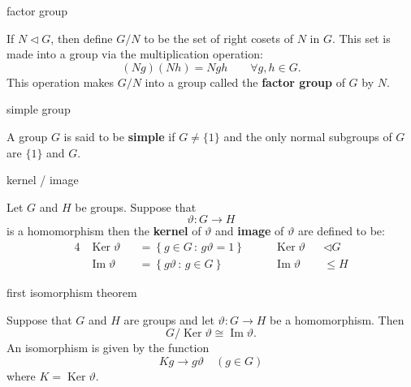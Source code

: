 \documentclass[avery5371,grid]{flashcards}
\renewcommand{\le}{\leqslant}
\renewcommand{\theta}{\vartheta}
\newcommand{\iso}{\cong}
\newcommand{\set}[2]{\ensuremath{\left\{ #1 \, : \, #2 \right\}}}
\newcommand{\normal}{\ensuremath{\lhd}}
\DeclareMathOperator{\Ker}{\ensuremath{\textrm{Ker}}}
\DeclareMathOperator{\Img}{\ensuremath{\textrm{Im}}}
\newcommand{\defn}[1]{\textbf{#1}}
\begin{document}
\begin{flashcard}[Definition]{factor group}

  If $N \normal G$, then define $G/N$ to be the set of right cosets of
  $N$ in $G$. This set is made into a group via the multiplication
  operation:
  \[
    (Ng)(Nh) = Ngh \qquad \forall g, h \in G.
  \]
  This operation makes $G/N$ into a group called the \defn{factor
    group} of $G$ by $N$.

\end{flashcard}

\begin{flashcard}[Definition]{simple group}

  A group $G$ is said to be \defn{simple} if $G \ne \{ 1 \}$ and the
  only normal subgroups of $G$ are $\{ 1 \}$ and $G$.
\end{flashcard}

\begin{flashcard}[Definition]{kernel / image}

  Let $G$ and $H$ be groups. Suppose that \[\theta : G \to H\] is a
  homomorphism then the \defn{kernel} of $\theta$ and \defn{image}
  of $\theta$ are defined to be:
  \begin{alignat*}{4}
    &\Ker \theta
    &&= \set{g \in G}{g\theta = 1} \quad
    && \Ker \theta &&\normal G \\
    &\Img \theta
    &&= \set{g\theta}{g \in G} \quad
    && \Img \theta &&\le H
  \end{alignat*}

\end{flashcard}

\begin{flashcard}[Theorem 1.10]{first isomorphism theorem}

  Suppose that $G$ and $H$ are groups and let $\theta: G \to H$ be a
  homomorphism. Then
  \[
    G / \Ker \theta \iso \Img \theta.
  \]
  An isomorphism is given by the function
  \[
    Kg \to g\theta \quad (g \in G)
  \]
  where $K = \Ker \theta$.
\end{flashcard}
\end{document}

